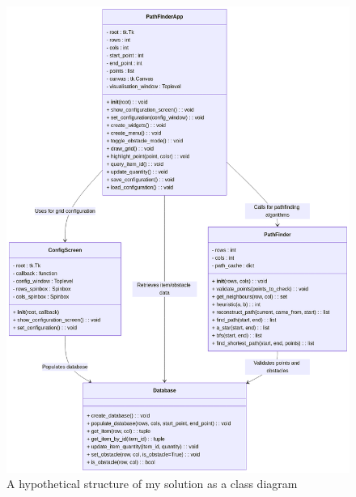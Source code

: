 \begin{figure}[!htbp]
    \centering
    \includegraphics[width=1\linewidth]{Images/classdiag1.png}
    \caption{A hypothetical structure of my solution as a class diagram}
\end{figure}

\newpage

